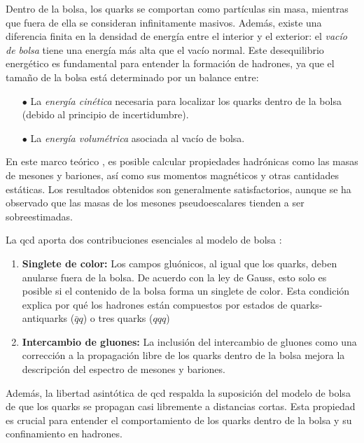 Dentro de la bolsa, los quarks se comportan como partículas sin masa, mientras que fuera de ella se consideran infinitamente masivos. Además, existe una diferencia finita en la densidad de energía entre el interior y el exterior: el \emph{vacío de bolsa} tiene una energía más alta que el vacío normal. Este desequilibrio energético es fundamental para entender la formación de hadrones, ya que el tamaño de la bolsa está determinado por un balance entre:
\begin{itemize}
    \item[$\bullet$] La \emph{energía cinética} necesaria para localizar los quarks dentro de la bolsa (debido al principio de incertidumbre).
    \item[$\bullet$] La \emph{energía volumétrica} asociada al vacío de bolsa.
\end{itemize}  %

En este marco teórico \cite{Chodos_1974}, es posible calcular propiedades hadrónicas como las masas de mesones y bariones, así como sus momentos magnéticos y otras cantidades estáticas. Los resultados obtenidos son generalmente satisfactorios, aunque se ha observado que las masas de los mesones pseudoescalares tienden a ser sobreestimadas. %

La \acrshort{qcd} aporta dos contribuciones esenciales al modelo de bolsa \cite{Chodos_1974}:

\begin{enumerate}
\item \textbf{Singlete de color:} Los campos gluónicos, al igual que los quarks, deben anularse fuera de la bolsa. De acuerdo con la ley de Gauss, esto solo es posible si el contenido de la bolsa forma un singlete de color. Esta condición explica por qué los hadrones están compuestos por estados de quarks-antiquarks  ($\bar{q}q$) o tres quarks ($qqq$)
\item \textbf{Intercambio de gluones:} La inclusión del intercambio de gluones como una corrección a la propagación libre de los quarks dentro de la bolsa mejora la descripción del espectro de mesones y bariones.
\end{enumerate}

Además, la libertad asintótica de \acrshort{qcd} respalda la suposición del modelo de bolsa de que los quarks se propagan casi libremente a distancias cortas. Esta propiedad es crucial para entender el comportamiento de los quarks dentro de la bolsa y su confinamiento en hadrones.

